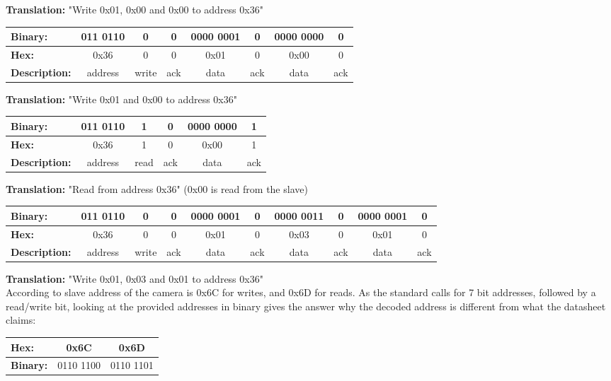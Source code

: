 \textbf{Translation:} "Write 0x01, 0x00 and 0x00 to \iic address 0x36"


\begin{tabular}{|l|c|c|c|c|c|c|c|}
\hline 
\textbf{Binary:} & 011 0110 & 0 & 0 & 0000 0001 & 0 & 0000 0000 & 0 \\ 
\hline 
\textbf{Hex:} & 0x36 & 0 & 0 & 0x01 & 0 & 0x00 & 0 \\ 
\hline 
\textbf{Description:} & address & write & ack & data & ack & data & ack \\ 
\hline 
\end{tabular}

\textbf{Translation:} "Write 0x01 and 0x00 to \iic address 0x36"\\


\begin{tabular}{|l|c|c|c|c|c|}
\hline 
\textbf{Binary:} & 011 0110 & 1 & 0 & 0000 0000 & 1 \\ 
\hline 
\textbf{Hex:} & 0x36 & 1 & 0 & 0x00 & 1 \\ 
\hline 
\textbf{Description:} & address & read & ack & data & ack \\ 
\hline 
\end{tabular}

\textbf{Translation:} "Read from \iic address 0x36" (0x00 is read from the slave)\\


\begin{tabular}{|l|c|c|c|c|c|c|c|c|c|}
\hline 
\textbf{Binary:} & 011 0110 & 0 & 0 & 0000 0001 & 0 & 0000 0011 & 0 & 0000 0001 & 0 \\ 
\hline 
\textbf{Hex:} & 0x36 & 0 & 0 & 0x01 & 0 & 0x03 & 0 & 0x01 & 0 \\ 
\hline 
\textbf{Description:} & address & write & ack & data & ack & data & ack & data & ack \\ 
\hline 
\end{tabular} 

\textbf{Translation:} "Write 0x01, 0x03 and 0x01 to \iic address 0x36" \\

According to \citep[p. 77]{picam_datasheet} \iic slave address of the camera is 0x6C for writes, and 0x6D for reads. As the \iic standard calls for 7 bit addresses, followed by a read/write bit, looking at the provided addresses in binary gives the answer why the decoded address is different from what the datasheet claims:
\begin{center}
\begin{tabular}{|l|c|c|}
\hline 
\textbf{Hex:} & 0x6C & 0x6D \\ 
\hline 
\textbf{Binary:} & 0110 1100 & 0110 1101 \\ 
\hline 
\end{tabular} 
\end{center}

